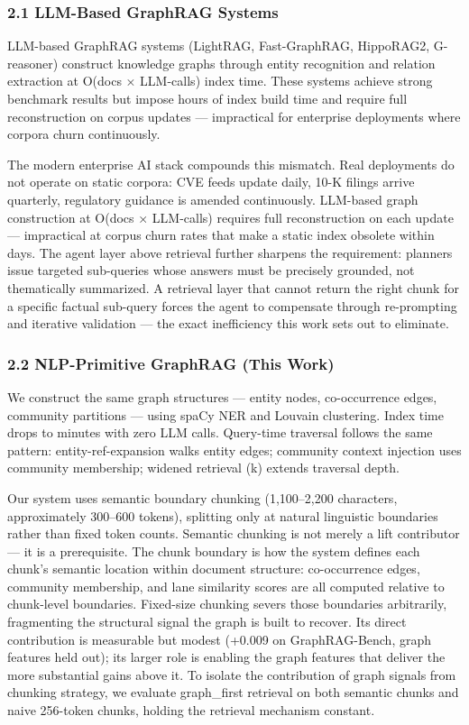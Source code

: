 \documentclass[
]{article}
\begin{document}
\subsubsection{2.1 LLM-Based GraphRAG
Systems}\label{llm-based-graphrag-systems}

LLM-based GraphRAG systems (LightRAG, Fast-GraphRAG, HippoRAG2,
G-reasoner) construct knowledge graphs through entity recognition and
relation extraction at O(docs × LLM-calls) index time. These systems
achieve strong benchmark results but impose hours of index build time
and require full reconstruction on corpus updates --- impractical for
enterprise deployments where corpora churn continuously.

The modern enterprise AI stack compounds this mismatch. Real deployments
do not operate on static corpora: CVE feeds update daily, 10-K filings
arrive quarterly, regulatory guidance is amended continuously. LLM-based
graph construction at O(docs × LLM-calls) requires full reconstruction
on each update --- impractical at corpus churn rates that make a static
index obsolete within days. The agent layer above retrieval further
sharpens the requirement: planners issue targeted sub-queries whose
answers must be precisely grounded, not thematically summarized. A
retrieval layer that cannot return the right chunk for a specific
factual sub-query forces the agent to compensate through re-prompting
and iterative validation --- the exact inefficiency this work sets out
to eliminate.

\subsubsection{2.2 NLP-Primitive GraphRAG (This
Work)}\label{nlp-primitive-graphrag-this-work}

We construct the same graph structures --- entity nodes, co-occurrence
edges, community partitions --- using spaCy NER and Louvain clustering.
Index time drops to minutes with zero LLM calls. Query-time traversal
follows the same pattern: entity-ref-expansion walks entity edges;
community context injection uses community membership; widened retrieval
(k) extends traversal depth.

Our system uses semantic boundary chunking (1,100--2,200 characters,
approximately 300--600 tokens), splitting only at natural linguistic
boundaries rather than fixed token counts. Semantic chunking is not
merely a lift contributor --- it is a prerequisite. The chunk boundary
is how the system defines each chunk's semantic location within document
structure: co-occurrence edges, community membership, and lane
similarity scores are all computed relative to chunk-level boundaries.
Fixed-size chunking severs those boundaries arbitrarily, fragmenting the
structural signal the graph is built to recover. Its direct contribution
is measurable but modest (+0.009 on GraphRAG-Bench, graph features held
out); its larger role is enabling the graph features that deliver the
more substantial gains above it. To isolate the contribution of graph
signals from chunking strategy, we evaluate graph\_first retrieval on
both semantic chunks and naive 256-token chunks, holding the retrieval
mechanism constant.
\end{document}
